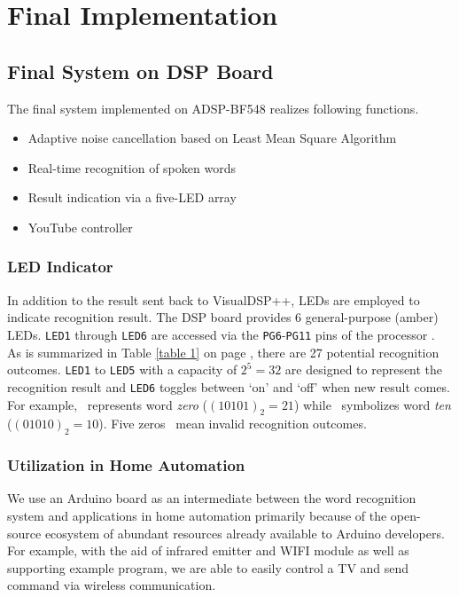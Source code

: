 \chapter{Final Implementation}
\label{chapter:implementation}

\section{Final System on DSP Board}
The final system implemented on ADSP-BF548 realizes following functions.
\begin{itemize}
\item Adaptive noise cancellation based on Least Mean Square Algorithm
\item Real-time recognition of spoken words
\item Result indication via a five-LED array
\item YouTube controller
\end{itemize}

\subsection{LED Indicator}
In addition to the result sent back to VisualDSP++, LEDs are employed to indicate recognition result. The DSP board provides 6 general-purpose (\textcolor{orange_html}{amber}) LEDs. \texttt{LED1} through \texttt{LED6} are accessed via the \texttt{PG6}-\texttt{PG11} pins of the processor \cite{bf548-manual}.\\

As is summarized in Table \ref{table 1} on page \pageref{table 1}, there are 27 potential recognition outcomes. \texttt{LED1} to \texttt{LED5} with a capacity of $2^5 = 32$ are designed to represent the recognition result and \texttt{LED6} toggles between `on' and `off' when new result comes. For example, \LED\onLED\offLED\onLED\offLED\onLED\ represents word \textit{zero} ($(10101)_2 = 21$) while \LED\offLED\onLED\offLED\onLED\offLED\ symbolizes word \textit{ten} ($(01010)_2 = 10$). Five zeros \LED\offLED\offLED\offLED\offLED\offLED\ mean invalid recognition outcomes.

\subsection{Utilization in Home Automation}
We use an Arduino\textsuperscript{\textregistered} board as an intermediate between the word recognition system and applications in home automation primarily because of the open-source ecosystem of abundant resources already available to Arduino developers. For example, with the aid of infrared emitter and WIFI module as well as supporting example program, we are able to easily control a TV and send command via wireless communication.


